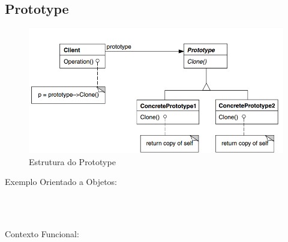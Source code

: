 \subsection{Prototype}

\begin{figure}[htb]
	\caption{\label{fig_grafico}Estrutura do Prototype}
	\begin{center}
	    \includegraphics[scale=0.5]{5_padroes-contexto-funcional/5.1_criacionais/5.1.4_prototype/diagram.png}
	\end{center}
\end{figure}

Exemplo Orientado a Objetos:

\begin{lstlisting}[caption={Prototype Orientado a Objetos},label=ooprototype]



\end{lstlisting}

Contexto Funcional:


\begin{lstlisting}[caption={Prototype Funcional},label=fpprototype]
    

    
\end{lstlisting}